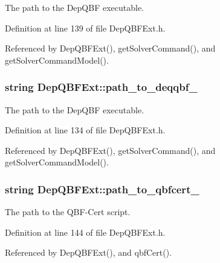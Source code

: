 The path to the Dep\-Q\-B\-F executable. 



Definition at line 139 of file Dep\-Q\-B\-F\-Ext.\-h.



Referenced by Dep\-Q\-B\-F\-Ext(), get\-Solver\-Command(), and get\-Solver\-Command\-Model().

\hypertarget{classDepQBFExt_a4c952a6d69e93efc5cd6c5491f85c5b3}{
\subsubsection[{path\-\_\-to\-\_\-deqqbf\-\_\-}]{\setlength{\rightskip}{0pt plus 5cm}string Dep\-Q\-B\-F\-Ext\-::path\-\_\-to\-\_\-deqqbf\-\_\-\hspace{0.3cm}{\ttfamily [protected]}}}\label{classDepQBFExt_a4c952a6d69e93efc5cd6c5491f85c5b3}


The path to the Dep\-Q\-B\-F executable. 



Definition at line 134 of file Dep\-Q\-B\-F\-Ext.\-h.



Referenced by Dep\-Q\-B\-F\-Ext(), get\-Solver\-Command(), and get\-Solver\-Command\-Model().

\hypertarget{classDepQBFExt_a05676410e9b70c5e83cb13b708e2f178}{
\subsubsection[{path\-\_\-to\-\_\-qbfcert\-\_\-}]{\setlength{\rightskip}{0pt plus 5cm}string Dep\-Q\-B\-F\-Ext\-::path\-\_\-to\-\_\-qbfcert\-\_\-\hspace{0.3cm}{\ttfamily [protected]}}}\label{classDepQBFExt_a05676410e9b70c5e83cb13b708e2f178}


The path to the Q\-B\-F-\/\-Cert script. 



Definition at line 144 of file Dep\-Q\-B\-F\-Ext.\-h.



Referenced by Dep\-Q\-B\-F\-Ext(), and qbf\-Cert().

